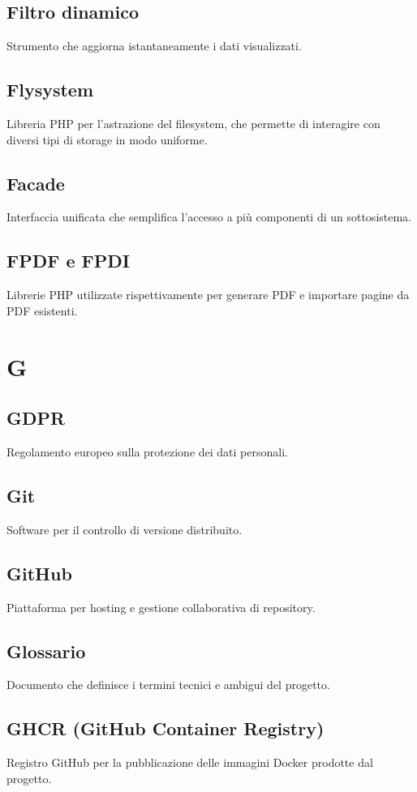 \documentclass[a4paper,12pt]{article}
\begin{document}
\subsection{Filtro dinamico}
Strumento che aggiorna istantaneamente i dati visualizzati.

\subsection{Flysystem}
Libreria PHP per l'astrazione del filesystem, che permette di interagire con diversi tipi di storage in modo uniforme.

\subsection{Facade}
Interfaccia unificata che semplifica l'accesso a più componenti di un sottosistema.

\subsection{FPDF e FPDI}
Librerie PHP utilizzate rispettivamente per generare PDF e importare pagine da PDF esistenti.

\section{G}
\subsection{GDPR}
Regolamento europeo sulla protezione dei dati personali.

\subsection{Git}
Software per il controllo di versione distribuito.

\subsection{GitHub}
Piattaforma per hosting e gestione collaborativa di repository.

\subsection{Glossario}
Documento che definisce i termini tecnici e ambigui del progetto.

\subsection{GHCR (GitHub Container Registry)}
Registro GitHub per la pubblicazione delle immagini Docker prodotte dal progetto.
\end{document}
